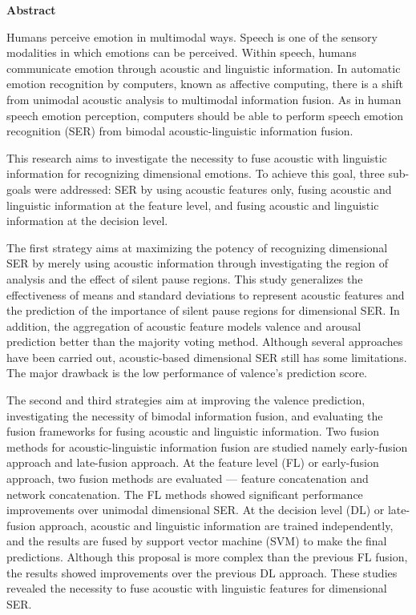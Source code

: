 \thispagestyle{plain}
\renewcommand{\nomname}{ABSTRACT}
\markboth{\nomname}{\nomname}

\strut
\vspace{5pt}

\begin{center}
{\LARGE\bf Abstract}
\end{center}
\vspace{5pt}
Humans perceive emotion in multimodal ways. Speech is one of the sensory
modalities in which emotions can be perceived. Within speech, humans communicate
emotion through acoustic and linguistic information. In automatic emotion
recognition by computers, known as affective computing, there is a shift from
unimodal acoustic analysis to multimodal information fusion. As in human speech
emotion perception, computers should be able to perform speech emotion
recognition (SER) from bimodal acoustic-linguistic information fusion.
 
This research aims to investigate the necessity to fuse acoustic with
linguistic information for recognizing dimensional emotions. To achieve this
goal, three sub-goals were addressed: SER by using acoustic features only,
fusing acoustic and linguistic information at the feature level, and fusing
acoustic and linguistic information at the decision level.

The first strategy aims at maximizing the potency of recognizing dimensional
SER by merely using acoustic information through investigating the region of
analysis and the effect of silent pause regions. This study generalizes the
effectiveness of means and standard deviations to represent acoustic features
and the prediction of the importance of silent pause regions for dimensional
SER. In addition, the aggregation of acoustic feature models valence and
arousal prediction better than the majority voting method. Although several
approaches have been carried out, acoustic-based dimensional SER still has some
limitations. The major drawback is the low performance of valence's prediction
score.

The second and third strategies aim at improving the valence prediction,
investigating the necessity of bimodal information fusion, and evaluating the
fusion frameworks for fusing acoustic and linguistic information. Two fusion
methods for acoustic-linguistic information fusion are studied namely
early-fusion approach and late-fusion approach. At the feature level (FL) or
early-fusion approach, two fusion methods are evaluated --- feature
concatenation and network concatenation. The FL methods showed significant
performance improvements over unimodal dimensional SER.  At the decision level
(DL) or late-fusion approach, acoustic and linguistic information are trained
independently, and the results are fused by support vector machine (SVM) to
make the final predictions.  Although this proposal is more complex than the
previous FL fusion, the results showed improvements over the previous DL
approach. These studies revealed the necessity to fuse acoustic with linguistic
features for dimensional SER.

